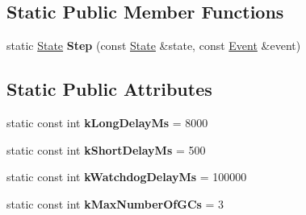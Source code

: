 \subsection*{Static Public Member Functions}
\begin{DoxyCompactItemize}
\item 
static \hyperlink{structv8_1_1internal_1_1_memory_reducer_1_1_state}{State} {\bfseries Step} (const \hyperlink{structv8_1_1internal_1_1_memory_reducer_1_1_state}{State} \&state, const \hyperlink{structv8_1_1internal_1_1_memory_reducer_1_1_event}{Event} \&event)\hypertarget{classv8_1_1internal_1_1_memory_reducer_acb773a2429f9006c75dda44558b28250}{}\label{classv8_1_1internal_1_1_memory_reducer_acb773a2429f9006c75dda44558b28250}

\end{DoxyCompactItemize}
\subsection*{Static Public Attributes}
\begin{DoxyCompactItemize}
\item 
static const int {\bfseries k\+Long\+Delay\+Ms} = 8000\hypertarget{classv8_1_1internal_1_1_memory_reducer_a9560a6e073f69b8bbb7f3f91025405e9}{}\label{classv8_1_1internal_1_1_memory_reducer_a9560a6e073f69b8bbb7f3f91025405e9}

\item 
static const int {\bfseries k\+Short\+Delay\+Ms} = 500\hypertarget{classv8_1_1internal_1_1_memory_reducer_ab7e2131ef74777b24fdf47f2a0f1c925}{}\label{classv8_1_1internal_1_1_memory_reducer_ab7e2131ef74777b24fdf47f2a0f1c925}

\item 
static const int {\bfseries k\+Watchdog\+Delay\+Ms} = 100000\hypertarget{classv8_1_1internal_1_1_memory_reducer_aea8eec9cb70717cff5db71c98545dc22}{}\label{classv8_1_1internal_1_1_memory_reducer_aea8eec9cb70717cff5db71c98545dc22}

\item 
static const int {\bfseries k\+Max\+Number\+Of\+G\+Cs} = 3\hypertarget{classv8_1_1internal_1_1_memory_reducer_aed193ce51a1f1f504c51869abe024b7b}{}\label{classv8_1_1internal_1_1_memory_reducer_aed193ce51a1f1f504c51869abe024b7b}

\end{DoxyCompactItemize}
